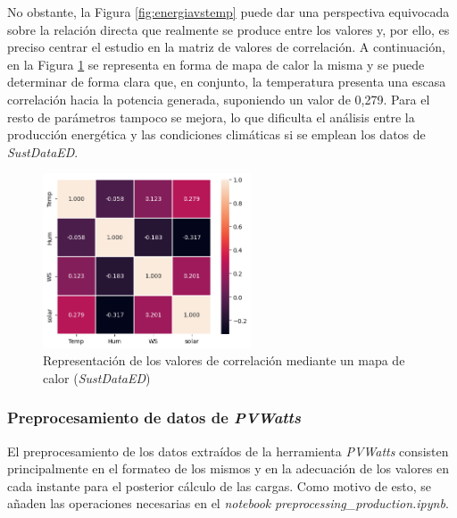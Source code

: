 \vspace{3mm}

No obstante, la Figura \ref{fig:energiavstemp} puede dar una perspectiva equivocada sobre la relación directa que realmente se produce entre los valores y, por ello, es preciso centrar el estudio en la matriz de valores de correlación. A continuación, en la Figura \ref{fig:corr2} se representa en forma de mapa de calor la misma y se puede determinar de forma clara que, en conjunto, la temperatura presenta una escasa correlación hacia la potencia generada, suponiendo un valor de 0,279. Para el resto de parámetros tampoco se mejora, lo que dificulta el análisis entre la producción energética y las condiciones climáticas si se emplean los datos de \textit{SustDataED}.

\vspace{3mm}

\begin{figure}[H]
  \centering
  \includegraphics[width=0.55\textwidth]{img/diseno/corr2.png}
  \caption{Representación de los valores de correlación mediante un mapa de calor (\textit{SustDataED})}
  \label{fig:corr2}
\end{figure}

\subsubsection{Preprocesamiento de datos de \textit{PVWatts}}
\label{sec:preprocpvwatts}

El preprocesamiento de los datos extraídos de la herramienta \textit{PVWatts} consisten principalmente en el formateo de los mismos y en la adecuación de los valores en cada instante para el posterior cálculo de las cargas. Como motivo de esto, se añaden las operaciones necesarias en el \textit{notebook} \textit{preprocessing\_production.ipynb}. 

\vspace{3mm}

